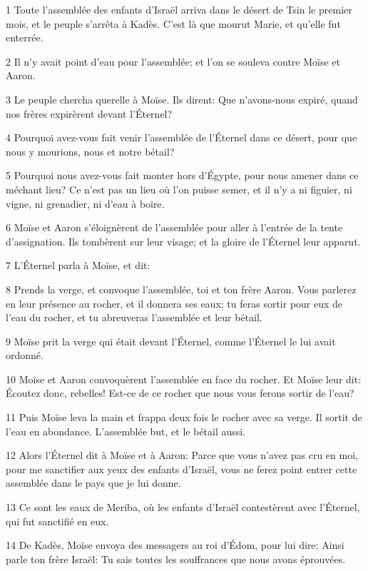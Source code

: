 \par 1 Toute l'assemblée des enfants d'Israël arriva dans le désert de Tsin le premier mois, et le peuple s'arrêta à Kadès. C'est là que mourut Marie, et qu'elle fut enterrée.
\par 2 Il n'y avait point d'eau pour l'assemblée; et l'on se souleva contre Moïse et Aaron.
\par 3 Le peuple chercha querelle à Moïse. Ils dirent: Que n'avons-nous expiré, quand nos frères expirèrent devant l'Éternel?
\par 4 Pourquoi avez-vous fait venir l'assemblée de l'Éternel dans ce désert, pour que nous y mourions, nous et notre bétail?
\par 5 Pourquoi nous avez-vous fait monter hors d'Égypte, pour nous amener dans ce méchant lieu? Ce n'est pas un lieu où l'on puisse semer, et il n'y a ni figuier, ni vigne, ni grenadier, ni d'eau à boire.
\par 6 Moïse et Aaron s'éloignèrent de l'assemblée pour aller à l'entrée de la tente d'assignation. Ils tombèrent sur leur visage; et la gloire de l'Éternel leur apparut.
\par 7 L'Éternel parla à Moïse, et dit:
\par 8 Prends la verge, et convoque l'assemblée, toi et ton frère Aaron. Vous parlerez en leur présence au rocher, et il donnera ses eaux; tu feras sortir pour eux de l'eau du rocher, et tu abreuveras l'assemblée et leur bétail.
\par 9 Moïse prit la verge qui était devant l'Éternel, comme l'Éternel le lui avait ordonné.
\par 10 Moïse et Aaron convoquèrent l'assemblée en face du rocher. Et Moïse leur dit: Écoutez donc, rebelles! Est-ce de ce rocher que nous vous ferons sortir de l'eau?
\par 11 Puis Moïse leva la main et frappa deux fois le rocher avec sa verge. Il sortit de l'eau en abondance. L'assemblée but, et le bétail aussi.
\par 12 Alors l'Éternel dit à Moïse et à Aaron: Parce que vous n'avez pas cru en moi, pour me sanctifier aux yeux des enfants d'Israël, vous ne ferez point entrer cette assemblée dans le pays que je lui donne.
\par 13 Ce sont les eaux de Meriba, où les enfants d'Israël contestèrent avec l'Éternel, qui fut sanctifié en eux.
\par 14 De Kadès, Moïse envoya des messagers au roi d'Édom, pour lui dire: Ainsi parle ton frère Israël: Tu sais toutes les souffrances que nous avons éprouvées.
